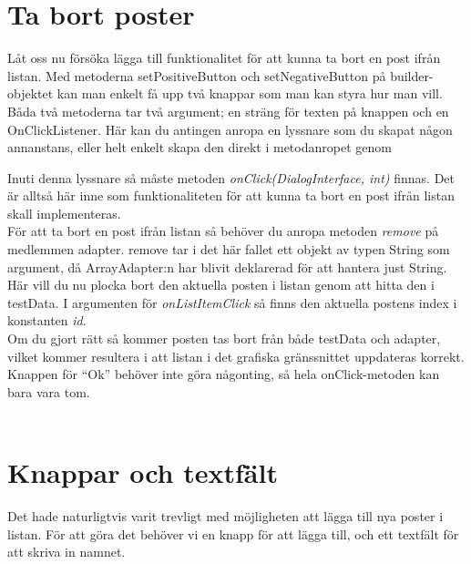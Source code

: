 \documentclass[11 pt]{article} %
\begin{document}
\section{Ta bort poster}
Låt oss nu försöka lägga till funktionalitet för att kunna ta bort en post ifrån listan. 
Med metoderna setPositiveButton och setNegativeButton på builder-objektet kan man enkelt få upp två knappar som man kan styra hur man vill. Båda två metoderna tar två argument; en sträng för texten på knappen och en OnClickListener.
Här kan du antingen anropa en lyssnare som du skapat någon annanstans, eller helt enkelt skapa den direkt i metodanropet genom 


Inuti denna lyssnare så måste metoden \textit{onClick(DialogInterface, int)} finnas. Det är alltså här inne som funktionaliteten för att kunna ta bort en post ifrån listan skall implementeras.\\

För att ta bort en post ifrån listan så behöver du anropa metoden \textit{remove} på medlemmen adapter. remove tar i det här fallet ett objekt av typen String som argument, då ArrayAdapter:n har blivit deklarerad för att hantera just String. Här vill du nu plocka bort den aktuella posten i listan genom att hitta den i testData.
I argumenten för \textit{onListItemClick} så finns den aktuella postens index i konstanten \textit{id}.\\  
Om du gjort rätt så kommer posten tas bort från både testData och adapter, vilket kommer resultera i att listan i det grafiska gränssnittet uppdateras korrekt.\\

Knappen för “Ok” behöver inte göra någonting, så hela onClick-metoden kan bara vara tom.\\ \\


\section{Knappar och textfält}
Det hade naturligtvis varit trevligt med möjligheten att lägga till nya poster i listan. För att göra det behöver vi en knapp för att lägga till, och ett textfält för att skriva in namnet.\\
\end{document}
